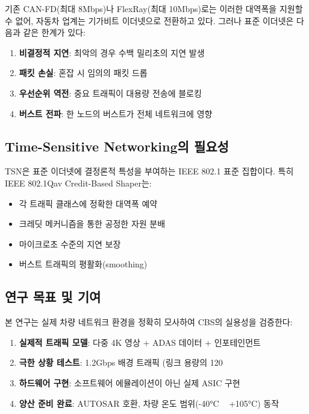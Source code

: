 \documentclass[twocolumn,10pt]{article}
\begin{document}
기존 CAN-FD(최대 8Mbps)나 FlexRay(최대 10Mbps)로는 이러한 대역폭을 지원할 수 없어, 자동차 업계는 기가비트 이더넷으로 전환하고 있다. 그러나 표준 이더넷은 다음과 같은 한계가 있다:

\begin{enumerate}
    \item \textbf{비결정적 지연}: 최악의 경우 수백 밀리초의 지연 발생
    \item \textbf{패킷 손실}: 혼잡 시 임의의 패킷 드롭
    \item \textbf{우선순위 역전}: 중요 트래픽이 대용량 전송에 블로킹
    \item \textbf{버스트 전파}: 한 노드의 버스트가 전체 네트워크에 영향
\end{enumerate}

\subsection{Time-Sensitive Networking의 필요성}

TSN은 표준 이더넷에 결정론적 특성을 부여하는 IEEE 802.1 표준 집합이다. 특히 IEEE 802.1Qav Credit-Based Shaper는:

\begin{itemize}
    \item 각 트래픽 클래스에 정확한 대역폭 예약
    \item 크레딧 메커니즘을 통한 공정한 자원 분배
    \item 마이크로초 수준의 지연 보장
    \item 버스트 트래픽의 평활화(smoothing)
\end{itemize}

\subsection{연구 목표 및 기여}

본 연구는 실제 차량 네트워크 환경을 정확히 모사하여 CBS의 실용성을 검증한다:

\begin{enumerate}
    \item \textbf{실제적 트래픽 모델}: 다중 4K 영상 + ADAS 데이터 + 인포테인먼트
    \item \textbf{극한 상황 테스트}: 1.2Gbps 배경 트래픽 (링크 용량의 120%
    \item \textbf{하드웨어 구현}: 소프트웨어 에뮬레이션이 아닌 실제 ASIC 구현
    \item \textbf{양산 준비 완료}: AUTOSAR 호환, 차량 온도 범위(-40°C ~ +105°C) 동작
\end{enumerate}
\end{document}
